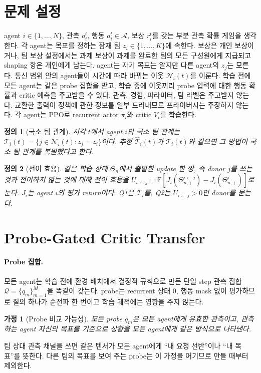 \documentclass[twocolumn,10pt]{article}
\newtheorem{assumption}{가정}
\newtheorem{definition}{정의}
\theoremstyle{remark}
\begin{document}
\section{문제 설정}
\label{sec:setting}
agent $i\in\{1,\dots,N\}$, 관측 $o_i^t$, 행동 $a_i^t\in\mathcal{A}$, 보상 $r_i^t$를 갖는 부분 관측 확률 게임을 생각한다. 각
agent는 목표를 정하는 잠재 팀 $z_i\in\{1,\dots,K\}$에 속한다. 보상은 개인 보상이거나, 팀 보상 설정에서는 과제 보상이 과제를
완료한 팀의 모든 구성원에게 지급되고 shaping 항은 개인에게 남는다. agent는 자기 목표는 알지만 다른 agent의 $z_j$는 모른다. 통신
범위 안의 agent들이 시간에 따라 바뀌는 이웃 $\mathcal{N}_i(t)$를 이룬다. 학습 전에 모든 agent는 같은 probe 집합을 받고, 학습
중에 이웃끼리 probe 입력에 대한 행동 확률과 critic 예측을 주고받을 수 있다. 관측, 경험, 파라미터, 팀 라벨은 주고받지 않는다.
교환한 출력이 정책에 관한 정보를 일부 드러내므로 프라이버시는 주장하지 않는다. 각 agent는 PPO로 recurrent actor $\pi_i$와 critic
$V_i$를 학습한다.

\begin{definition}[국소 팀 관계]
시각 $t$에서 agent $i$의 국소 팀 관계는 $\mathcal{T}_i(t)=\{j\in\mathcal{N}_i(t): z_j=z_i\}$이다. 추정 $\hat{\mathcal{T}}_i(t)$가
$\mathcal{T}_i(t)$와 같으면 그 방법이 국소 팀 관계를 복원했다고 한다.
\end{definition}

\begin{definition}[전이 효용]
같은 학습 상태 $\Theta_n$에서 출발한 update 한 쌍, 즉 donor $j$를 쓰는 것과 전이하지 않는 것에 대해 전이 효용을
$U_{i\leftarrow j}=\mathbb{E}[J_i(\Theta^{i\leftarrow j}_{n,+})-J_i(\Theta^{i}_{n,+})]$로 둔다. $J_i$는 agent $i$의 평가 return이다.
Q1은 $\mathcal{T}_i$를, Q2는 $U_{i\leftarrow j}>0$인 donor를 묻는다.
\end{definition}

\section{Probe-Gated Critic Transfer}
\label{sec:method}
\paragraph{Probe 집합.} 모든 agent는 학습 전에 환경 배치에서 결정적 규칙으로 만든 단일 step 관측 집합
$\mathcal{Q}=\{q_m\}_{m=1}^{M}$을 똑같이 갖는다. probe는 recurrent 상태 0, 행동 mask 없이 평가하므로 질의 하나가 순전파 한 번이고
학습 궤적에는 영향을 주지 않는다.

\begin{assumption}[Probe 비교 가능성]
\label{as:comparability}
모든 probe $q_m$은 모든 agent에게 유효한 관측이고, 관측하는 agent 자신의 목표를 기준으로 상황을 모든 agent에게 같은 방식으로
나타낸다.
\end{assumption}
팀 상대 관측 채널을 쓰면 같은 텐서가 모든 agent에게 ``내 요청 선반''이나 ``내 목표''를 뜻한다. 다른 팀의 목표를 보여 주는
probe는 이 가정을 어기므로 만들 때부터 제외한다.
\end{document}
